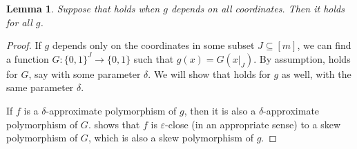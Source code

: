 \documentclass{article}
\newtheorem{lemma}[theorem]{Lemma}
\theoremstyle{definition}
\theoremstyle{remark}
\newcommand\eps{\varepsilon}
\renewcommand\epsilon{\eps}
\begin{document}
\begin{lemma} \label{lem:approximate-polymogrphism-all-coords}
Suppose that  holds when $g$ depends on all coordinates. Then it holds for all $g$.
\end{lemma}
\begin{proof}
If $g$ depends only on the coordinates in some subset $J \subseteq [m]$, we can find a function $G\colon \{0,1\}^J \to \{0,1\}$ such that $g(x) = G(x|_J)$. By assumption,  holds for $G$, say with some parameter $\delta$. We will show that  holds for $g$ as well, with the same parameter $\delta$.

If $f$ is a $\delta$-approximate polymorphism of $g$, then it is also a $\delta$-approximate polymorphism of $G$.  shows that $f$ is $\epsilon$-close (in an appropriate sense) to a skew polymorphism of $G$, which is also a skew polymorphism of $g$.
\end{proof}
\end{document}
